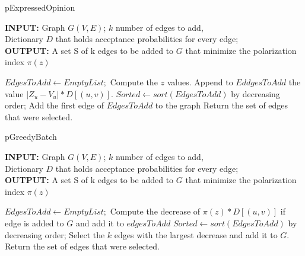 \begin{algorithm}[H]
	\caption{pExpressedΟpinion}
	\label{alg:pexpressedOpinion}
	
	\begin{flushleft}
        		\textbf{INPUT:} Graph $G(V, E)$; $k$ number of edges to add,\\
		Dictionary $D$ that holds acceptance probabilities for every edge;\\
		\vspace{6pt}
        		\textbf{OUTPUT:} A set S of k edges to be added to $G$ that minimize the polarization
		\\ index $\pi(z)$
	\end{flushleft}
	
	\begin{algorithmic}[1]
		\FOR {$i = 1:k \ $}
			\STATE $EdgesToAdd \leftarrow Empty List;$
			\STATE Compute the $z$ values.
			\FOR { each  edge in $|V| \times |V| \textbackslash E$}
				\STATE Append to $EddgesToAdd$ the value $|Z_u - V_u| * D[(u,v)]$.
			\ENDFOR
			\STATE $Sorted \leftarrow sort(EdgesToAdd)$ by decreasing order;
			\STATE Add the first edge of $EdgesToAdd$ to the graph
		\ENDFOR
		\STATE Return the set of edges that were selected.
	\end{algorithmic}
	
\end{algorithm}



\begin{algorithm}[htbp]
		
			\caption{pGreedyBatch}
			\label{alg:pgreedyBatch}
			
			\begin{flushleft}
        				\textbf{INPUT:} Graph $G(V, E)$; $k$ number of edges to add,\\
				Dictionary $D$ that holds acceptance probabilities for every edge;\\
				\vspace{6pt}
        				\textbf{OUTPUT:} A set S of k edges to be added to $G$ that minimize the polarization \\ index $\pi(z)$
			\end{flushleft}
			
			\begin{algorithmic}[1]
				\STATE $EdgesToAdd \leftarrow Empty List;$
					\STATE Compute the decrease of $\pi(z) * D[(u,v)] $ if edge is added to $G$ and add it to $edgesToAdd$
				\ENDFOR
				\STATE $Sorted \leftarrow sort(EdgesToAdd)$ by decreasing order;
				\STATE Select the $k$ edges with the largest decrease and add it to $G$.
				\STATE Return the set of edges that were selected.

	\end{algorithmic}
			
\end{algorithm}


